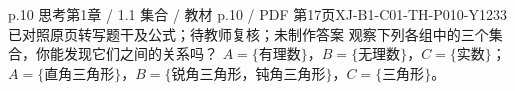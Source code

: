 \par\noindent\begin{minipage}{\linewidth}
\begin{bankitem}{p.10 思考}{第1章 / 1.1 集合 / 教材 p.10 / PDF 第17页}{XJ-B1-C01-TH-P010-Y1233}{已对照原页转写题干及公式；待教师复核；未制作答案}
观察下列各组中的三个集合，你能发现它们之间的关系吗？
$A=\{\text{有理数}\}$，$B=\{\text{无理数}\}$，$C=\{\text{实数}\}$；
$A=\{\text{直角三角形}\}$，$B=\{\text{锐角三角形，钝角三角形}\}$，$C=\{\text{三角形}\}$。
\end{bankitem}
\end{minipage}\par\medskip
